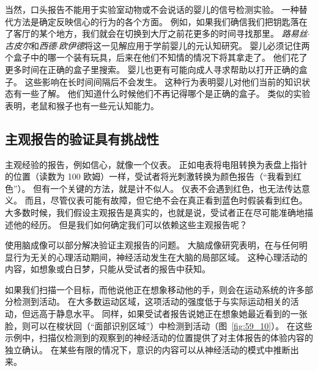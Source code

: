 当然，口头报告不能用于实验室动物或不会说话的婴儿的信号检测实验。
一种替代方法是确定反映信心的行为的各个方面。
例如，如果我们确信我们把钥匙落在了客厅的某个地方，我们就会在切换到大厅之前花更多的时间寻找那里。
\textit{路易丝$\cdot$古皮尔}和\textit{西德$\cdot$欧伊德}将这一见解应用于学前婴儿的元认知研究。
婴儿必须记住两个盒子中的哪一个装有玩具，后来在他们不知情的情况下将其拿走了。
他们花了更多时间在正确的盒子里搜索。
婴儿也更有可能向成人寻求帮助以打开正确的盒子。
这些影响在长时间间隔后不会发生。
这种行为表明婴儿对他们当前的知识状态有一些了解。
他们知道什么时候他们不再记得哪个是正确的盒子。
类似的实验表明，老鼠和猴子也有一些元认知能力。



\subsection{主观报告的验证具有挑战性}

主观经验的报告，例如信心，就像一个仪表。
正如电表将电阻转换为表盘上指针的位置（读数为 100 欧姆）一样，受试者将光刺激转换为颜色报告（“我看到红色”）。
但有一个关键的方法，就是计不似人。
仪表不会遇到红色，也无法传达意义。
而且，尽管仪表可能有故障，但它绝不会在真正看到蓝色时假装看到红色。
大多数时候，我们假设主观报告是真实的，也就是说，受试者正在尽可能准确地描述他的经历。
但是我们如何确定我们可以依赖这些主观报告呢？


使用脑成像可以部分解决验证主观报告的问题。
大脑成像研究表明，在与任何明显行为无关的心理活动期间，神经活动发生在大脑的局部区域。
这种心理活动的内容，如想象或白日梦，只能从受试者的报告中获知。


如果我们扫描一个目标，而他说他正在想象移动他的手，则会在运动系统的许多部分检测到活动。
在大多数运动区域，这项活动的强度低于与实际运动相关的活动，但远高于静息水平。
同样，如果受试者报告说她正在想象她最近看到的一张脸，则可以在梭状回（“面部识别区域”）中检测到活动（图~\ref{fig:59_10}）。
在这些示例中，扫描仪检测到的观察到的神经活动的位置提供了对主体报告的体验内容的独立确认。
在某些有限的情况下，意识的内容可以从神经活动的模式中推断出来。


